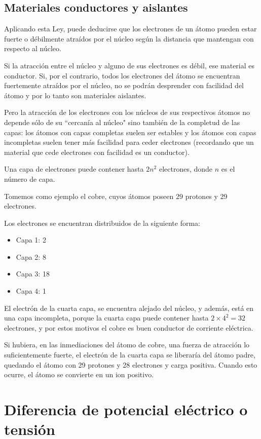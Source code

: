\subsection{Materiales conductores y aislantes}

Aplicando esta Ley, puede deducirse que los electrones de un átomo pueden estar fuerte o débilmente atraídos por el núcleo según la distancia que mantengan con respecto al núcleo.

Si la atracción entre el núcleo y alguno de sus electrones es débil, ese material es conductor. Si, por el contrario, todos los electrones del átomo se encuentran fuertemente atraídos por el núcleo, no se podrán desprender con facilidad del átomo y por lo tanto son materiales aislantes.

Pero la atracción de los electrones con los núcleos de sus respectivos átomos no depende sólo de su ``cercanía al núcleo" sino también de la completud de las capas: los átomos con capas completas suelen ser estables y los átomos con capas incompletas suelen tener más facilidad para ceder electrones (recordando que un material que cede electrones con facilidad es un conductor).

Una capa de electrones puede contener hasta $2n^{2}$ electrones, donde $n$ es el número de capa.

Tomemos como ejemplo el cobre, cuyos átomos poseen 29 protones y 29 electrones.

Los electrones se encuentran distribuidos de la siguiente forma:
\begin{itemize}
	\item Capa 1: 2
	\item Capa 2: 8
	\item Capa 3: 18
	\item Capa 4: 1
\end{itemize}

El electrón de la cuarta capa, se encuentra alejado del núcleo, y además, está en una capa incompleta, porque la cuarta capa puede contener hasta $2\times 4^{2}=32$ electrones, y por estos motivos el cobre es buen conductor de corriente eléctrica.

Si hubiera, en las inmediaciones del átomo de cobre, una fuerza de atracción lo suficientemente fuerte, el electrón de la cuarta capa se liberaría del átomo padre, quedando el átomo con 29 protones y 28 electrones y carga positiva. Cuando esto ocurre, el átomo se convierte en un ion positivo.

\section{Diferencia de potencial eléctrico o tensión}

